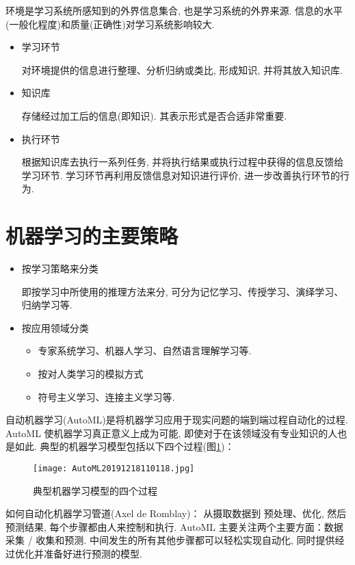 环境是学习系统所感知到的外界信息集合, 也是学习系统的外界来源. 信息的水平(一般化程度)和质量(正确性)对学习系统影响较大.

\begin{itemize}
\item 学习环节

    对环境提供的信息进行整理、分析归纳或类比, 形成知识, 并将其放入知识库.
\item 知识库

    存储经过加工后的信息(即知识). 其表示形式是否合适非常重要.
\item 执行环节

    根据知识库去执行一系列任务, 并将执行结果或执行过程中获得的信息反馈给学习环节. 学习环节再利用反馈信息对知识进行评价, 进一步改善执行环节的行为.
\end{itemize}
\section{机器学习的主要策略}

\begin{itemize}
\item 按学习策略来分类

即按学习中所使用的推理方法来分, 可分为记忆学习、传授学习、演绎学习、归纳学习等.

\item 按应用领域分类
    \begin{itemize}
      \item 专家系统学习、机器人学习、自然语言理解学习等.
    \item 按对人类学习的模拟方式
    \item 符号主义学习、连接主义学习等.
    \end{itemize}
\end{itemize}

自动机器学习(AutoML)是将机器学习应用于现实问题的端到端过程自动化的过程. AutoML 使机器学习真正意义上成为可能, 即使对于在该领域没有专业知识的人也是如此.
典型的机器学习模型包括以下四个过程(图\ref{AutoML2019fig2702})：
\begin{figure}[H]
\centering
\texttt{[image: AutoML20191218110118.jpg]}
\caption{典型机器学习模型的四个过程}
\label{AutoML2019fig2702}
\end{figure}
如何自动化机器学习管道(Axel de Romblay)：
从摄取数据到 预处理、优化, 然后预测结果, 每个步骤都由人来控制和执行. AutoML 主要关注两个主要方面：数据采集 / 收集和预测. 中间发生的所有其他步骤都可以轻松实现自动化, 同时提供经过优化并准备好进行预测的模型.
